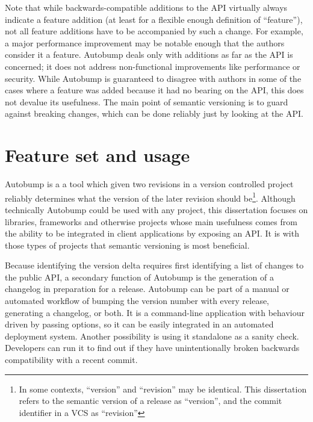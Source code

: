 \documentclass{l4proj}
\begin{document}
Note that while backwards-compatible additions to the API virtually
always indicate a feature addition (at least for a flexible enough
definition of ``feature''), not all feature additions have to be
accompanied by such a change. For example, a major performance
improvement may be notable enough that the authors consider it a
feature. Autobump deals only with additions as far as the API is
concerned; it does not address non-functional improvements like
performance or security.
While Autobump is guaranteed to disagree with authors in some of the
cases where a feature was added because it had no bearing on the API,
this does not devalue its usefulness. The main point of semantic
versioning is to guard against breaking changes, which can be done
reliably just by looking at the API.

\vspace{-1.4\baselineskip}
\section{Feature set and usage}
\vspace{-0.6\baselineskip}

Autobump is a a tool which given two revisions in a version
controlled project reliably determines what the version of the later
revision should be\footnote{In some contexts, ``version'' and
``revision'' may be identical. This dissertation refers to the
semantic version of a release as ``version'', and the commit
identifier in a VCS as ``revision''}.
Although technically Autobump could be used with any project, this
dissertation focuses on libraries, frameworks and otherwise projects
whose main usefulness comes from the ability to be integrated in
client applications by exposing an API. It is with those types of
projects that semantic versioning is most beneficial.

Because identifying the version delta requires first identifying a
list of changes to the public API, a secondary function of Autobump is
the generation of a changelog in preparation for a release.
Autobump can be part of a manual or automated workflow of bumping the
version number with every release, generating a changelog, or both. It
is a command-line application with behaviour driven by passing
options, so it can be easily integrated in an automated deployment
system. Another possibility is using it standalone as a sanity check.
Developers can run it to find out if they have unintentionally broken
backwards compatibility with a recent commit.
\end{document}
